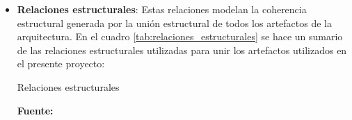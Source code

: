 \begin{itemize}

\item \textbf{Relaciones estructurales}: Estas relaciones modelan la coherencia estructural generada por la unión estructural de todos los artefactos de la arquitectura. En el cuadro \ref{tab:relaciones_estructurales} se hace un sumario de las relaciones estructurales utilizadas para unir los artefactos utilizados en el presente proyecto:

\begin{table}
  \caption{Relaciones estructurales}
  \label{tab:relaciones_estructurales}

  \begin{center}
  
  \textbf{Fuente:} \cite{archimate2}
  

\end{center}
\end{table}
\end{itemize}
